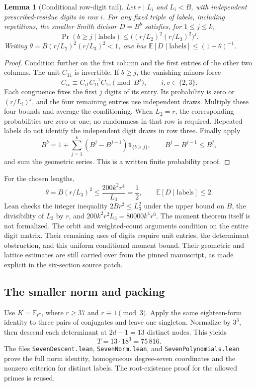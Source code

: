 \documentclass[11pt]{article}
\newtheorem{lemma}{Lemma}
\begin{document}
\begin{lemma}[Conditional row-digit tail]
Let $r\mid L_i$ and $L_i<B$, with independent prescribed-residue digits
in row $i$. For any fixed triple of labels, including repetitions,
the smaller Smith divisor $D=B^b$ satisfies, for $1\le j\le k$,
\[
 \Pr(b\ge j\mid\text{labels})
 \le \bigl((r/L_2)^2(r/L_3)^2\bigr)^j.
\]
Writing $\theta=B(r/L_2)^2(r/L_3)^2<1$, one has
$\mathbb E[D\mid\text{labels}]\le(1-\theta)^{-1}$.
\end{lemma}
\begin{proof}
Condition further on the first column and the first entries of the
other two columns. The unit $C_{11}$ is invertible. If $b\ge j$, the
vanishing minors force
\[
 C_{iv}\equiv C_{i1}C_{11}^{-1}C_{1v}\pmod{B^j},
 \qquad i,v\in\{2,3\}.
\]
Each congruence fixes the first $j$ digits of its entry. Its probability
is zero or $(r/L_i)^j$, and the four remaining entries use independent
draws. Multiply these four bounds and average the conditioning.
When $L_2=r$, the corresponding probabilities are zero or one;
no randomness in that row is required. Repeated labels do not identify
the independent digit draws in row three. Finally apply
\[
 B^b=1+\sum_{j=1}^k(B^j-B^{j-1})\mathbf1_{\{b\ge j\}},
 \qquad B^j-B^{j-1}\le B^j,
\]
and sum the geometric series. This is a written finite probability proof.
\end{proof}
For the chosen lengths,
\[
 \theta=B(r/L_3)^2\le\frac{200k^2r^4}{L_3}=\frac12,
 \qquad\mathbb E[D\mid\text{labels}]\le2.
\]
Lean checks the integer inequality $2Br^2\le L_3^2$ under the upper
bound on $B$, the divisibility of $L_3$ by $r$, and
$200k^2r^2L_3=80000k^4r^6$.
The moment theorem itself is not formalized.
The orbit and weighted-count arguments condition on the entire digit
matrix. Their remaining uses of digits require unit entries, the
determinant obstruction, and this uniform conditional moment bound.
Their geometric and lattice estimates are still carried over from the
pinned manuscript, as made explicit in the six-section source patch.

\subsection{The smaller norm and packing}
Use $K=\mathbb F_{r^7}$, where $r\ge37$ and $r\equiv1\pmod3$.
Apply the same eighteen-form identity to three pairs of conjugates and
leave one singleton. Normalize by $3^3$, then descend each determinant
at $2d-1=13$ distinct nodes. This yields
\[
 T=13\cdot18^3=75\,816.
\]
The files \texttt{SevenDescent.lean}, \texttt{SevenNorm.lean}, and
\texttt{SevenPolynomials.lean} prove the full norm identity, homogeneous
degree-seven coordinates and the nonzero criterion for distinct labels.
The root-existence proof for the allowed primes is reused.
\end{document}
